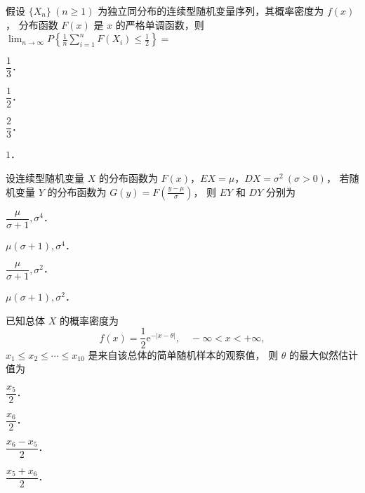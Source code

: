 \begin{question}[index=8]
假设 $\{X_n\}\ (n\ge1)$ 为独立同分布的连续型随机变量序列，其概率密度为 $f(x)$，
分布函数 $F(x)$ 是 $x$ 的严格单调函数，则
$\displaystyle\lim_{n\to\infty}P\left\{\frac1n\sum_{i=1}^n F(X_i)\le\frac12\right\}=$
\begin{choices}[columns=4,label-pos=left]
\item $\dfrac13$．
\item $\dfrac12$．
\item $\dfrac23$．
\item $1$．
\end{choices}
\end{question}
\QuestionBreak

\begin{question}[index=9]
设连续型随机变量 $X$ 的分布函数为 $F(x)$，$EX=\mu$，$DX=\sigma^2\ (\sigma>0)$，
若随机变量 $Y$ 的分布函数为 $\displaystyle G(y)=F\left(\frac{y-\mu}{\sigma}\right)$，
则 $EY$ 和 $DY$ 分别为
\begin{choices}[columns=4,label-pos=left]
\item $\dfrac{\mu}{\sigma+1},\sigma^4$．
\item $\mu(\sigma+1),\sigma^4$．
\item $\dfrac{\mu}{\sigma+1},\sigma^2$．
\item $\mu(\sigma+1),\sigma^2$．
\end{choices}
\end{question}
\QuestionBreak

\begin{question}[index=10]
已知总体 $X$ 的概率密度为
\[
f(x)=\frac12\mathrm e^{-|x-\theta|},\quad -\infty<x<+\infty,
\]
$x_1\le x_2\le\cdots\le x_{10}$ 是来自该总体的简单随机样本的观察值，
则 $\theta$ 的最大似然估计值为
\begin{choices}[columns=4,label-pos=left]
\item $\dfrac{x_5}2$．
\item $\dfrac{x_6}2$．
\item $\dfrac{x_6-x_5}2$．
\item $\dfrac{x_5+x_6}2$．
\end{choices}
\end{question}
